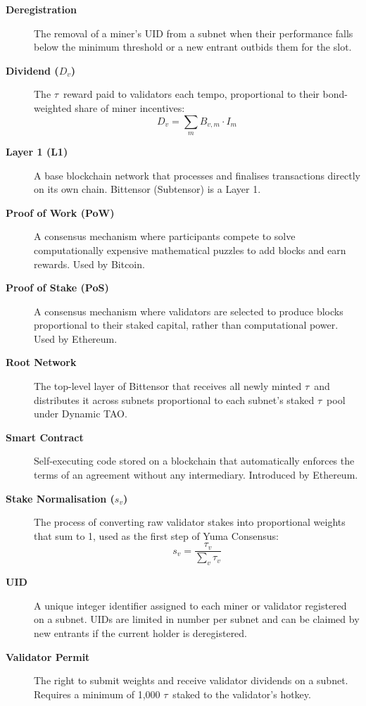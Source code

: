 \documentclass[12pt, a4paper, oneside]{report}
\newcommand{\TAO}{$\tau$}            %
\theoremstyle{definition}
\begin{document}
\begin{description}
  \item[\textbf{Deregistration}] The removal of a miner's UID from a subnet 
  when their performance falls below the minimum threshold or a new entrant 
  outbids them for the slot.

  \item[\textbf{Dividend ($D_v$)}] The \TAO\ reward paid to validators each 
  tempo, proportional to their bond-weighted share of miner incentives:
  \[
    D_v = \sum_{m} B_{v,m} \cdot I_m
  \]

  \item[\textbf{Layer 1 (L1)}] A base blockchain network that processes and 
  finalises transactions directly on its own chain. Bittensor (Subtensor) 
  is a Layer 1.

  \item[\textbf{Proof of Work (PoW)}] A consensus mechanism where participants 
  compete to solve computationally expensive mathematical puzzles to add 
  blocks and earn rewards. Used by Bitcoin.

  \item[\textbf{Proof of Stake (PoS)}] A consensus mechanism where validators 
  are selected to produce blocks proportional to their staked capital, 
  rather than computational power. Used by Ethereum.

  \item[\textbf{Root Network}] The top-level layer of Bittensor that receives 
  all newly minted \TAO\ and distributes it across subnets proportional to 
  each subnet's staked \TAO\ pool under Dynamic TAO.

  \item[\textbf{Smart Contract}] Self-executing code stored on a blockchain 
  that automatically enforces the terms of an agreement without any 
  intermediary. Introduced by Ethereum.

  \item[\textbf{Stake Normalisation ($s_v$)}] The process of converting raw 
  validator stakes into proportional weights that sum to 1, used as the 
  first step of Yuma Consensus:
  \[
    s_v = \frac{\tau_v}{\sum_{v} \tau_v}
  \]

  \item[\textbf{UID}] A unique integer identifier assigned to each miner or 
  validator registered on a subnet. UIDs are limited in number per subnet 
  and can be claimed by new entrants if the current holder is deregistered.

  \item[\textbf{Validator Permit}] The right to submit weights and receive 
  validator dividends on a subnet. Requires a minimum of 1,000 \TAO\ 
  staked to the validator's hotkey.




\end{description}





\end{document}
